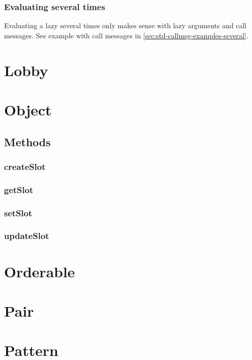 \subsubsection{Evaluating several times}

Evaluating a lazy several times only makes sense with lazy arguments
and call messages. See example with call messages in
\autoref{sec:std-callmsg-examples-several}.



\section{Lobby}
\section{Object}

\subsection{Methods}

\subsubsection{createSlot}
\label{sec:std-object-createslot}

\subsubsection{getSlot}
\label{sec:std-object-getslot}

\subsubsection{setSlot}
\label{sec:std-object-setslot}

\subsubsection{updateSlot}
\label{sec:std-object-updateslot}

\section{Orderable}
\section{Pair}
\section{Pattern}
